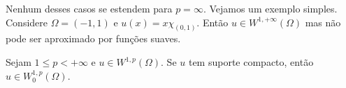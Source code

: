 \begin{frame}
	\begin{obs}
			Nenhum desses casos se estendem para $p=\infty$. Vejamos um exemplo simples. Considere $\Omega=(-1,1)$ e $u(x)=x\chi_{(0,1)}$. Então $u\in W^{1,+\infty}(\Omega)$ mas não pode ser aproximado por funções suaves.
	\end{obs}

\begin{prop}
	Sejam $1\leq p<+\infty$ e $u\in W^{1,p}(\Omega)$. Se $u$ tem suporte compacto, então $u\in W^{1,p}_0(\Omega)$.
\end{prop}

%

\end{frame}


